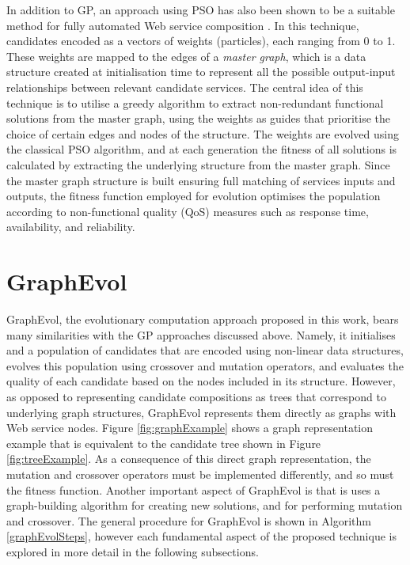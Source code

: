 \documentclass{article}
\begin{document}
In addition to GP, an approach using PSO has also been shown to be a suitable method for fully automated Web service composition \cite{silva2014graph}. In this technique, candidates encoded as a vectors of weights (particles), each ranging from 0 to 1. These weights are mapped to the edges of a \textit{master graph}, which is a data structure created at 
initialisation time to represent all the possible output-input relationships between relevant candidate services. The central idea of this technique is to utilise a greedy algorithm
to extract non-redundant functional solutions from the master graph, using the weights as guides that prioritise the choice of certain edges and nodes of the structure. The weights
are evolved using the classical PSO algorithm, and at each generation the fitness of all solutions is calculated by extracting the underlying structure from the master graph. Since
the master graph structure is built ensuring full matching of services inputs and outputs, the fitness function employed for evolution optimises the population according to non-functional quality (QoS) measures such as response time, availability, and reliability.

\section{GraphEvol}\label{graphevol}
GraphEvol, the evolutionary computation approach proposed in this work, bears many similarities with the GP approaches discussed above. Namely, it initialises and a population 
of candidates that are encoded using non-linear data structures, evolves this population using crossover and mutation operators, and evaluates the quality of each candidate
based on the nodes included in its structure. However, as opposed to representing candidate compositions as trees that correspond to underlying graph structures, GraphEvol
represents them directly as graphs with Web service nodes. Figure \ref{fig:graphExample} shows a graph representation example that is equivalent to the candidate tree shown in Figure \ref{fig:treeExample}. As a consequence of this direct graph representation, the mutation and crossover operators must be implemented differently, and so must the fitness function. Another important aspect of GraphEvol is that is uses a graph-building algorithm for creating new  solutions, and for performing mutation and crossover. The general procedure for GraphEvol is shown in Algorithm \ref{graphEvolSteps}, however each fundamental aspect of the proposed technique is explored in more detail in the following subsections.
\end{document}

